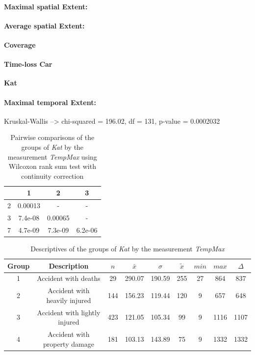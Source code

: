 \paragraph{Maximal spatial Extent:}
\paragraph{Average spatial Extent:}
\paragraph{Coverage}
\paragraph{Time-loss Car}

\large
\centerline{\textbf{Kat}}
\normalsize

\paragraph{Maximal temporal Extent:}
Kruskal-Wallis --> chi-squared = 196.02, df = 131, p-value = 0.0002032

\begin{table}[ht]
	\centering
	\begin{tabular}{c|c|c|c}
		\toprule  
  		& 1 & 2 & 3 \\ 
  		\midrule    
		2 & 0.00013 & -       & -   \\   
		\midrule
		3 & 7.4e-08 & 0.00065 & -     \\ 
		\midrule
		7 & 4.7e-09 & 7.3e-09 & 6.2e-06 \\
 		\bottomrule
	\end{tabular}
	\caption{Pairwise comparisons of the groups of \textit{Kat} by the measurement \textit{TempMax} using Wilcoxon rank sum test with continuity correction}
\end{table}

\begin{table}[ht]
	\centering
	\begin{tabular}{c|c|c|c|c|c|c|c|c}
		\toprule  
		Group & Description & $n$ & $\bar{x}$ & $\sigma$ & $\tilde{x}$ & $min$ & $max$ & $\Delta$ \\
		\midrule
		1 & Accident with deaths & 29 & 290.07 & 190.59 & 255 & 27 & 864 & 837 \\ 
 		2 & Accident with heavily injured & 144 & 156.23 & 119.44 & 120 & 9 & 657 & 648 \\
 		3 & Accident with lightly injured & 423 & 121.05 & 105.34 & 99 & 9 & 1116 & 1107 \\
 		4 & Accident with property damage & 181 & 103.13 & 143.89 & 75 & 9 & 1332 & 1332 \\ 
 		\bottomrule
	\end{tabular}
	\caption{Descriptives of the groups of \textit{Kat} by the measurement \textit{TempMax}}
\end{table}

